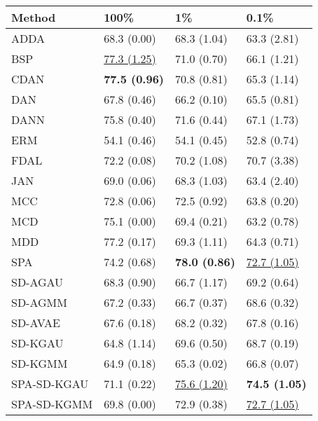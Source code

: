 \begin{tabular}{llll}
\toprule
Method & 100\% & 1\% & 0.1\% \\
\midrule
ADDA & 68.3 (0.00) & 68.3 (1.04) & 63.3 (2.81) \\
BSP & \underline{77.3 (1.25)} & 71.0 (0.70) & 66.1 (1.21) \\
CDAN & \textbf{77.5 (0.96)} & 70.8 (0.81) & 65.3 (1.14) \\
DAN & 67.8 (0.46) & 66.2 (0.10) & 65.5 (0.81) \\
DANN & 75.8 (0.40) & 71.6 (0.44) & 67.1 (1.73) \\
ERM & 54.1 (0.46) & 54.1 (0.45) & 52.8 (0.74) \\
FDAL & 72.2 (0.08) & 70.2 (1.08) & 70.7 (3.38) \\
JAN & 69.0 (0.06) & 68.3 (1.03) & 63.4 (2.40) \\
MCC & 72.8 (0.06) & 72.5 (0.92) & 63.8 (0.20) \\
MCD & 75.1 (0.00) & 69.4 (0.21) & 63.2 (0.78) \\
MDD & 77.2 (0.17) & 69.3 (1.11) & 64.3 (0.71) \\
SPA & 74.2 (0.68) & \textbf{78.0 (0.86)} & \underline{72.7 (1.05)} \\
\midrule

SD-AGAU & 68.3 (0.90) & 66.7 (1.17) & 69.2 (0.64) \\
SD-AGMM & 67.2 (0.33) & 66.7 (0.37) & 68.6 (0.32) \\
SD-AVAE & 67.6 (0.18) & 68.2 (0.32) & 67.8 (0.16) \\
SD-KGAU & 64.8 (1.14) & 69.6 (0.50) & 68.7 (0.19) \\
SD-KGMM & 64.9 (0.18) & 65.3 (0.02) & 66.8 (0.07) \\
SPA-SD-KGAU & 71.1 (0.22) & \underline{75.6 (1.20)} & \textbf{74.5 (1.05)} \\
SPA-SD-KGMM & 69.8 (0.00) & 72.9 (0.38) & \underline{72.7 (1.05)} \\
\bottomrule
\end{tabular}